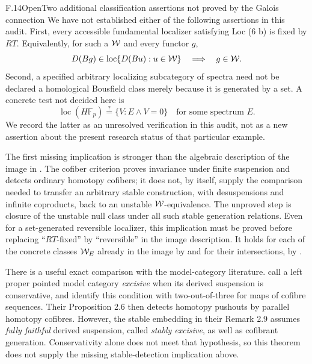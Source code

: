 \begin{claim}{F.14}{Open}{Two additional classification assertions not proved by the Galois connection}
We have not established either of the following assertions in this audit.
First, every accessible fundamental localizer satisfying Loc (6 b) is
fixed by $RT$. Equivalently, for such a $\mathcal{W}$ and every functor $g$,
\[
 D(Bg)\in\operatorname{loc}\{D(Bu):u\in\mathcal{W}\}
       \quad\Longrightarrow\quad g\in\mathcal{W}.
\]
Second, a specified arbitrary localizing subcategory of spectra need
not be declared a homological Bousfield class merely because it is
generated by a set. A concrete test not decided here is
\[
 \operatorname{loc}(H\mathbb F_p)
    \stackrel{?}{=}\{V:E\wedge V=0\}\quad\text{for some spectrum }E.
\]
We record the latter as an unresolved verification in this audit,
not as a new assertion about the present research status of that
particular example.
\end{claim}
The first missing implication is stronger than the algebraic description
of the image in . The cofiber criterion proves invariance
under finite suspension and detects ordinary homotopy cofibers; it does
not, by itself, supply the comparison needed to transfer an arbitrary
stable construction, with desuspensions and infinite coproducts, back
to an unstable $\mathcal{W}$-equivalence. The unproved step is closure of the
unstable null class under all such stable generation relations. Even
for a set-generated reversible localizer, this implication must be
proved before replacing ``$RT$-fixed'' by ``reversible'' in the image
description. It holds for each of the concrete classes $\mathcal{W}_E$ already
in the image by  and for their intersections, by
.

There is a useful exact comparison with the model-category literature.
\citet[Definition 2.1 and Proposition 2.3]{FBergerRatkovic2019}
call a left proper pointed model category \emph{excisive} when its
derived suspension is conservative, and identify this condition with
two-out-of-three for maps of cofibre sequences. Their Proposition 2.6
then detects homotopy pushouts by parallel homotopy cofibres.
However, the stable embedding in their Remark 2.9 assumes
\emph{fully faithful} derived suspension, called \emph{stably excisive},
as well as cofibrant generation. Conservativity alone does not meet
that hypothesis, so this theorem does not supply the missing
stable-detection implication above.

